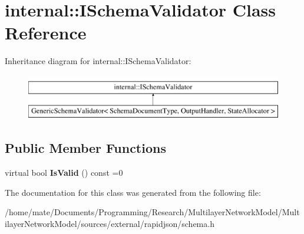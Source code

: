 \hypertarget{classinternal_1_1ISchemaValidator}{}\section{internal\+:\+:I\+Schema\+Validator Class Reference}
\label{classinternal_1_1ISchemaValidator}
Inheritance diagram for internal\+:\+:I\+Schema\+Validator\+:\begin{figure}[H]
\begin{center}
\leavevmode
\includegraphics[height=2.000000cm]{classinternal_1_1ISchemaValidator}
\end{center}
\end{figure}
\subsection*{Public Member Functions}
\begin{DoxyCompactItemize}
\item 
virtual bool {\bfseries Is\+Valid} () const  =0\hypertarget{classinternal_1_1ISchemaValidator_ad9c95f664966bec385dbe85f33a6ba3d}{}\label{classinternal_1_1ISchemaValidator_ad9c95f664966bec385dbe85f33a6ba3d}

\end{DoxyCompactItemize}


The documentation for this class was generated from the following file\+:\begin{DoxyCompactItemize}
\item 
/home/mate/\+Documents/\+Programming/\+Research/\+Multilayer\+Network\+Model/\+Multilayer\+Network\+Model/sources/external/rapidjson/schema.\+h\end{DoxyCompactItemize}
